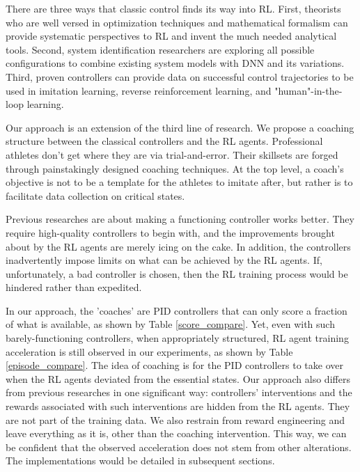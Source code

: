\documentclass[smallextended]{svjour3}
\begin{document}
There are three ways that classic control finds its way into RL. First, theorists who are well versed in optimization techniques and mathematical formalism can provide systematic perspectives to RL and invent the much needed analytical tools\cite{Han2020ActorCriticRL}\cite{Weinan2017APO}\cite{Dupont2019AugmentedNO}\cite{Betancourt2018OnSO}\cite{Nachum2020ReinforcementLV}. Second, system identification researchers are exploring all possible configurations to combine existing system models with DNN and its variations\cite{Hewing2020LearningBasedMP}\cite{Mohan2020EmbeddingHP}\cite{Lusch2018DeepLF}\cite{Bai2019DeepEM}\cite{BelbutePeres2020CombiningDP}. Third, proven controllers can provide data on successful control trajectories to be used in imitation learning, reverse reinforcement learning, and "human"-in-the-loop learning\cite{Knox2009InteractivelySA}\cite{Knox2010CombiningMF}\cite{Peng2018DeepMimicED}\cite{Peng2020LearningAR}\cite{Paine2018OneShotHI}.

Our approach is an extension of the third line of research. We propose a coaching structure between the classical controllers and the RL agents. Professional athletes don't get where they are via trial-and-error. Their skillsets are forged through painstakingly designed coaching techniques. At the top level, a coach's objective is not to be a template for the athletes to imitate after, but rather is to facilitate data collection on critical states. 

Previous researches\cite{Xie2018LearningWT}\cite{Carlucho2017IncrementalQS}\cite{Pavse2020RIDMRI} are about making a functioning controller works better. They require high-quality controllers to begin with, and the improvements brought about by the RL agents are merely icing on the cake. In addition, the controllers inadvertently impose limits on what can be achieved by the RL agents. If, unfortunately, a bad controller is chosen, then the RL training process would be hindered rather than expedited. 

In our approach, the 'coaches' are PID controllers that can only score a fraction of what is available, as shown by Table \ref{score_compare}. Yet, even with such barely-functioning controllers, when appropriately structured, RL agent training acceleration is still observed in our experiments, as shown by Table \ref{episode_compare}. The idea of coaching is for the PID controllers to take over when the RL agents deviated from the essential states. Our approach also differs from previous researches in one significant way: controllers' interventions and the rewards associated with such interventions are hidden from the RL agents. They are not part of the training data. We also restrain from reward engineering and leave everything as it is, other than the coaching intervention. This way, we can be confident that the observed acceleration does not stem from other alterations. The implementations would be detailed in subsequent sections.
\end{document}
